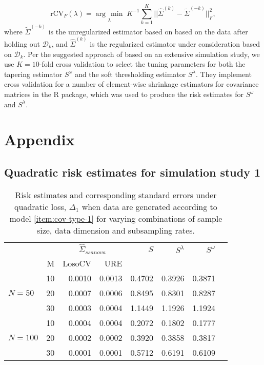 \documentclass[12pt]{article}
\newcommand{\argmin}[1]{\underset{#1}{\operatorname{arg}\,\operatorname{min}}\;}
\theoremstyle{definition}
\begin{document}
\begin{equation} \label{eq:K-fold-matrix-reverse-cv}
\mbox{rCV}_F\left(\lambda \right) = \argmin{\lambda} K^{-1} \sum_{k = 1}^K  \vert \vert\hat{\Sigma}^{\left(k\right)} - \tilde{\Sigma}^{\left(-k\right)}  \vert \vert_F^2, 
\end{equation}
\noindent
where $\tilde{\Sigma}^{\left(-k\right)}$ is the unregularized estimator based on based on the data after holding out $\mathcal{D}_k$, and $\hat{\Sigma}^{\left(k\right)}$ is the regularized estimator under consideration based on $\mathcal{D}_k$. Per the suggested approach of \citet{fang2016tuning} based on an extensive simulation study, we use $K = 10$-fold cross validation to select the tuning parameters for both the tapering estimator $S^\omega$ and the soft thresholding estimator $S^{\lambda}$. They implement cross validation for a number of element-wise shrinkage estimators for covariance matrices in the \citet{CVTuningCov} R package, which was used to produce the risk estimates for $S^{\omega}$ and $S^{\lambda}$.



\section{Appendix}

\subsection{Quadratic risk estimates for simulation study 1}

\setlength{\dashlinedash}{0.5pt}
\setlength{\dashlinegap}{1pt}
\setlength{\arrayrulewidth}{0.2pt}

\begin{table}[H]
\caption{Risk estimates and corresponding standard errors under quadratic loss, $\Delta_1$ when data are generated according to model \ref{item:cov-type-1} for varying combinations of sample size, data dimension and subsampling rates.}
\centering
\begin{tabular}{l|r|rrrrrr}
&  & \multicolumn{2}{c}{$\hat{\Sigma}_{ssanova}$} & $S$ & $S^\lambda$ & $S^\omega$ \\ 
&M & \mbox{LosoCV} & \mbox{URE} &  \\ 
\hline
		&    10 & 0.0010 & 0.0013 & 0.4702  & 0.3926 & 0.3871 \\ 
$N = 50$  &    20 & 0.0007 &  0.0006	& 0.8495 & 0.8301 & 0.8287 \\ 
  		&    30 & 0.0003 &  0.0004	& 1.1449 & 1.1926 & 1.1924  \\ \hdashline
		 &    10 & 0.0004 &  0.0004	& 0.2072 &  0.1802 & 0.1777\\ 
$N = 100$ &    20 & 0.0002 & 0.0002	& 0.3920  & 0.3858 & 0.3817 \\ 
   &    30 & 0.0001 & 0.0001 &0.5712 & 0.6191 & 0.6109 \\ 
\end{tabular}
\end{table}
\end{document}
